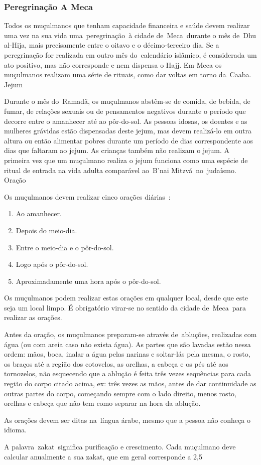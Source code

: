 \documentclass[12pt]{article}
\begin{document}
\subsubsection{Peregrinação A Meca}
Todos os muçulmanos que tenham capacidade financeira e saúde devem realizar uma vez na sua vida uma peregrinação à cidade de Meca durante o mês de Dhu al-Hija, mais precisamente entre o oitavo e o décimo-terceiro dia. Se a peregrinação for realizada em outro mês do calendário islâmico, é considerada um ato positivo, mas não corresponde e nem dispensa o Hajj. Em Meca os muçulmanos realizam uma série de rituais, como dar voltas em torno da Caaba.
Jejum
\par Durante o mês do Ramadã, os muçulmanos abstêm-se de comida, de bebida, de fumar, de relações sexuais ou de pensamentos negativos durante o período que decorre entre o amanhecer até ao pôr-do-sol. As pessoas idosas, os doentes e as mulheres grávidas estão dispensadas deste jejum, mas devem realizá-lo em outra altura ou então alimentar pobres durante um período de dias correspondente aos dias que faltaram ao jejum. As crianças também não realizam o jejum. A primeira vez que um muçulmano realiza o jejum funciona como uma espécie de ritual de entrada na vida adulta comparável ao B'nai Mitzvá no judaísmo.
Oração
\par Os muçulmanos devem realizar cinco orações diárias :
\begin{enumerate}
    \item Ao amanhecer.
    \item Depois do meio-dia.
    \item Entre o meio-dia e o pôr-do-sol.
    \item Logo após o pôr-do-sol.
    \item Aproximadamente uma hora após o pôr-do-sol.
\end{enumerate}
Os muçulmanos podem realizar estas orações em qualquer local, desde que este seja um local limpo. É obrigatório virar-se no sentido da cidade de Meca para realizar as orações.
\par Antes da oração, os muçulmanos preparam-se através de abluções, realizadas com água (ou com areia caso não exista água). As partes que são lavadas estão nessa ordem: mãos, boca, inalar a água pelas narinas e soltar-lás pela mesma, o rosto, os braços até a região dos cotovelos, as orelhas, a cabeça e os pés até aos tornozelos, não esquecendo que a ablução é feita três vezes sequências para cada região do corpo citado acima, ex: três vezes as mãos, antes de dar continuidade as outras partes do corpo, começando sempre com o lado direito, menos rosto, orelhas e cabeça que não tem como separar na hora da ablução.
\par As orações devem ser ditas na língua árabe, mesmo que a pessoa não conheça o idioma.
\par A palavra zakat significa purificação e crescimento. Cada muçulmano deve calcular anualmente a sua zakat, que em geral corresponde a 2,5%
\end{document}
